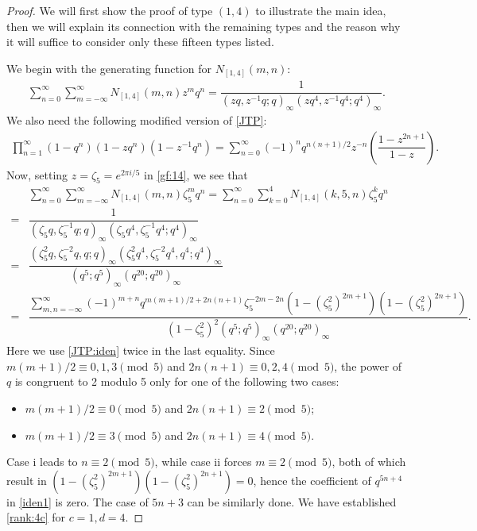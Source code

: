 \documentclass[12pt]{amsart}
\numberwithin{equation}{section}
\theoremstyle{plain}
\theoremstyle{definition}
\begin{document}
\begin{proof}
We will first show the proof of type $(1,4)$ to illustrate the main idea, then we will explain its connection with the remaining types and the reason why it will suffice to consider only these fifteen types listed.

We begin with the generating function for $N_{[1,4]}(m,n)$:
\begin{align}\label{gf:14}
\sum_{n=0}^{\infty}\sum_{m=-\infty}^{\infty}N_{[1,4]}(m,n)z^{m}q^{n}=\dfrac{1}{(zq,z^{-1}q;q)_{\infty}(zq^{4},z^{-1}q^{4};q^{4})_{\infty}}.
\end{align}
We also need the following modified version of \eqref{JTP}:
\begin{align}\label{JTP:iden}
\prod_{n=1}^{\infty}(1-q^{n})(1-zq^{n})(1-z^{-1}q^{n})=\sum_{n=0}^{\infty}(-1)^{n}q^{n(n+1)/2}z^{-n}\left(\dfrac{1-z^{2n+1}}{1-z}\right).
\end{align}
Now, setting $z=\zeta_{5}=e^{2\pi i/5}$ in \eqref{gf:14}, we see that
\begin{align}\label{iden1}
 &\sum_{n=0}^{\infty}\sum_{m=-\infty}^{\infty}N_{[1,4]}(m,n)\zeta_{5}^{m}q^{n}=\sum_{n=0}^{\infty}\sum_{k=0}^{4}N_{[1,4]}(k,5,n)\zeta_{5}^{k}q^{n} \\
 =&\dfrac{1}{(\zeta_{5}q,\zeta_{5}^{-1}q;q)_{\infty}(\zeta_{5}q^{4},\zeta_{5}^{-1}q^{4};q^{4})_{\infty}} \nonumber\\
 =&\dfrac{(\zeta_{5}^{2}q,\zeta_{5}^{-2}q,q;q)_{\infty}(\zeta_{5}^2q^{4},\zeta_{5}^{-2}q^{4},q^{4};q^{4})_{\infty}}{(q^{5};q^{5})_{\infty}(q^{20};q^{20})_{\infty}}\nonumber\\
 =&\dfrac{\sum_{m,n=-\infty}^{\infty}(-1)^{m+n}q^{m(m+1)/2+2n(n+1)}\zeta_{5}^{-2m-2n}\left(1-(\zeta_{5}^2)^{2m+1}\right)
 \left(1-(\zeta_{5}^{2})^{2n+1}\right)}
{(1-\zeta_{5}^2)^2(q^{5};q^{5})_{\infty}(q^{20};q^{20})_{\infty}}. \nonumber
\end{align}
Here we use \eqref{JTP:iden} twice in the last equality. Since $m(m+1)/2\equiv0,1,3\pmod{5}$ and $2n(n+1)\equiv0,2,4\pmod{5}$, the power of $q$ is congruent to 2 modulo 5 only for one of the following two cases:
\begin{itemize}
\item[i.] $m(m+1)/2\equiv0\pmod{5}$ and $2n(n+1)\equiv 2\pmod{5}$;
\item[ii.] $m(m+1)/2\equiv3\pmod{5}$ and $2n(n+1)\equiv 4\pmod{5}$.
\end{itemize}
Case i leads to $n\equiv 2\pmod{5}$, while case ii forces $m\equiv 2\pmod5$, both of which result in $(1-(\zeta_5^2)^{2m+1})(1-(\zeta_5^2)^{2n+1})=0$, hence the coefficient of $q^{5n+4}$ in \eqref{iden1} is zero. The case of $5n+3$ can be similarly done. We have established \eqref{rank:4c} for $c=1,d=4$.


\end{proof}
\end{document}
